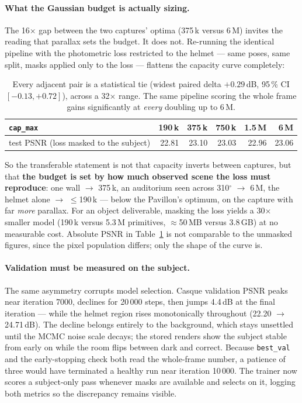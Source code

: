 \paragraph{What the Gaussian budget is actually sizing.}
The 16$\times$ gap between the two captures' optima (375\,k versus 6\,M) invites the reading
that parallax sets the budget. It does not. Re-running the identical pipeline with the
photometric loss restricted to the helmet --- same poses, same split, masks applied only to
the loss --- flattens the capacity curve completely:

\begin{table}[h]
\centering\small
\begin{tabular}{lrrrrr}
\toprule
\texttt{cap\_max} & 190\,k & 375\,k & 750\,k & 1.5\,M & 6\,M \\
\midrule
test PSNR (loss masked to the subject) & 22.81 & 23.10 & 23.03 & 22.96 & 23.06 \\
\bottomrule
\end{tabular}
\caption{Every adjacent pair is a statistical tie (widest paired delta $+0.29$\,dB, 95\,\%
CI $[-0.13, +0.72]$), across a 32$\times$ range. The same pipeline scoring the whole frame
gains significantly at \emph{every} doubling up to 6\,M.}
\label{tab:masked}
\end{table}

So the transferable statement is not that capacity inverts between captures, but that
\textbf{the budget is set by how much observed scene the loss must reproduce}: one wall
$\rightarrow$ 375\,k, an auditorium seen across 310$^\circ$ $\rightarrow$ 6\,M, the helmet
alone $\rightarrow$ $\leq$190\,k --- below the Pavillon's optimum, on the capture with far
\emph{more} parallax. For an object deliverable, masking the loss yields a 30$\times$
smaller model (190\,k versus 5.3\,M primitives, ${\approx}$50\,MB versus 3.8\,GB) at no
measurable cost. Absolute PSNR in Table~\ref{tab:masked} is not comparable to the unmasked
figures, since the pixel population differs; only the shape of the curve is.

\paragraph{Validation must be measured on the subject.}
The same asymmetry corrupts model selection. Casque validation PSNR peaks near iteration
7000, declines for 20\,000 steps, then jumps 4.4\,dB at the final iteration --- while the
helmet region rises monotonically throughout (22.20 $\rightarrow$ 24.71\,dB). The decline
belongs entirely to the background, which stays unsettled until the MCMC noise scale decays;
the stored renders show the subject stable from early on while the room flips between dark
and correct. Because \texttt{best\_val} and the early-stopping check both read the
whole-frame number, a patience of three would have terminated a healthy run near iteration
10\,000. The trainer now scores a subject-only pass whenever masks are available and selects
on it, logging both metrics so the discrepancy remains visible.

